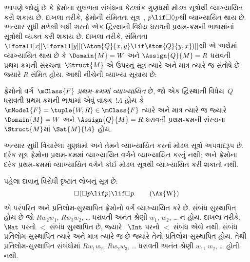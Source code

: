 \begingroup
\makeatletter{}\makeatother


\label{guunit:OLP-0424}


આપણે જોયું છે કે ફ્રેમોના સુલભતા સંબંધના કેટલાંક
ગુણધર્મો મોડલ સૂત્રોથી વ્યાખ્યાયિત કરી શકાય છે.
દાખલા તરીકે, ફ્રેમોની સંમિતતા સૂત્ર~,
$p \lif \Box\Diamond
p$થી વ્યાખ્યાયિત થાય છે. અત્યાર સુધી મળેલી બધી
શરતો એક દ્વિસ્થાની વિધેય ધરાવતી
પ્રથમ-ક્રમની ભાષામાંનાં સૂત્રોથી
વ્યક્ત કરી શકાય છે. દાખલા તરીકે, સંમિતતા
$\lforall[x][\lforall[y][(\Atom{Q}{x,y} \lif \Atom{Q}{y, x})]]$થી
એ અર્થમાં વ્યાખ્યાયિત થાય છે કે $\Domain{M} =
W$ અને $\Assign{Q}{M} = R$ ધરાવતી પ્રથમ-ક્રમની
સંરચના~$\Struct{M}$ એ ઉપરનું સૂત્ર ત્યારે અને
માત્ર ત્યારે જ સંતોષે છે જ્યારે $R$ સંમિત હોય.
આથી નીચેની વ્યાખ્યા સૂચાય છે:

\begin{defn}
  ફ્રેમોનો વર્ગ~$\mClass{F}$ \emph{પ્રથમ-ક્રમમાં વ્યાખ્યાયિત}
  છે, જો એક દ્વિસ્થાની વિધેય~$Q$ ધરાવતી
  પ્રથમ-ક્રમની ભાષામાં એવું વાક્ય~$!A$
  હોય કે $\mModel{F} =
  \tuple{W, R} \in \mClass{F}$ ત્યારે અને માત્ર ત્યારે જ
  જ્યારે $\Domain{M} = W$ અને $\Assign{Q}{M}
  = R$ ધરાવતી પ્રથમ-ક્રમની સંરચના~$\Struct{M}$માં
  $\Sat{M}{!A}$ હોય.
\end{defn}

અત્યાર સુધી વિચારેલા ગુણધર્મો અને તેમને વ્યાખ્યાયિત
કરતાં મોડલ સૂત્રો અપવાદરૂપ છે. દરેક
સૂત્ર ફ્રેમોના પ્રથમ-ક્રમમાં વ્યાખ્યાયિત વર્ગને
વ્યાખ્યાયિત કરતું નથી; અને ફ્રેમોના દરેક પ્રથમ-ક્રમમાં
વ્યાખ્યાયિત વર્ગને કોઈ મોડલ સૂત્રથી વ્યાખ્યાયિત
કરી શકાતો નથી.

પહેલા દાવાનું વિરોધી દૃષ્ટાંત લોબનું સૂત્ર છે:
\begin{equation}
\Box(\Box p \lif p) \lif \Box p. \tag{\Ax{W}}
\end{equation}
 એ પરંપરિત અને પ્રતિલોમ-સુસ્થાપિત ફ્રેમોનો
વર્ગ વ્યાખ્યાયિત કરે છે. સંબંધ સુસ્થાપિત હોય છે જો
$Rw_2w_1$, $Rw_3w_2$, \dots{} ધરાવતી અનંત શ્રેણી
$w_1$, $w_2$, \dots{} ન હોય. દાખલા તરીકે,
~$\Nat$ પરનો $<$ સંબંધ સુસ્થાપિત છે, જ્યારે
~$\Int$ પરનો $<$ સંબંધ એવો નથી. સંબંધ
પ્રતિલોમ-સુસ્થાપિત ત્યારે અને માત્ર ત્યારે જ છે
જ્યારે તેનો પ્રતિલોમ સુસ્થાપિત હોય. તેથી
પ્રતિલોમ-સુસ્થાપિત સંબંધોમાં $Rw_1w_2$,
$Rw_2w_3$, \dots{} ધરાવતી અનંત શ્રેણી
$w_1$, $w_2$, \dots{} હોતી નથી.

